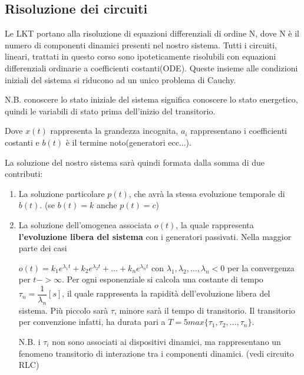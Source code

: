 \documentclass{article}
\begin{document}
\subsection{Risoluzione dei circuiti}
\noindent Le LKT portano alla risoluzione di equazioni differenziali di ordine N, dove N è il numero di componenti dinamici presenti nel 
nostro sistema. Tutti i circuiti, lineari, trattati in questo corso sono ipoteticamente risolubili con equazioni differenziali ordinarie
a coefficienti costanti(ODE). Queste insieme alle condizioni iniziali del sistema si riducono ad un unico problema di Cauchy.

\noindent N.B. conoscere lo stato iniziale del sistema significa conoscere lo stato energetico, quindi le variabili di stato prima dell'inizio
del transitorio.

\medskip
\noindent{}
\medskip

\noindent Dove $x(t)$ rappresenta la grandezza incognita, $a_i$ rappresentano i coefficienti costanti e $b(t)$ è il termine noto(generatori ecc...).

\noindent La soluzione del nostro sistema sarà quindi formata dalla somma di due contributi:
\begin{enumerate}
    \item La soluzione particolare $p(t)$, che avrà la stessa evoluzione temporale di $b(t)$. (se $b(t)=k$ anche $p(t)=c$)
    \item La soluzione dell'omogenea associata $o(t)$, la quale rappresenta \textbf{l'evoluzione libera del sistema} con i generatori 
    passivati. Nella maggior parte dei casi 
    
    \noindent $o(t)=k_1e^{\lambda_1t}+k_2e^{\lambda_2t}+\dots+k_ne^{\lambda_nt}$ con $\lambda_1,\lambda_2,\dots,\lambda_n < 0$ per la convergenza
    per $t->\infty$. Per ogni esponenziale si calcola una costante di tempo $\tau_n=\dfrac{1}{\lambda_n}[s]$, il quale rappresenta la rapidità
    dell'evoluzione libera del sistema. Più piccolo sarà $\tau$, minore sarà il tempo di transitorio. Il transitorio per convenzione infatti,
    ha durata pari a $T=5max\{\tau_1,\tau_2,\dots,\tau_n\}$. 

    \noindent N.B. i $\tau_i$ non sono associati ai dispositivi dinamici, ma rappresentano un fenomeno transitorio di interazione tra i componenti 
    dinamici. (vedi circuito RLC)
\end{enumerate}
\end{document}
